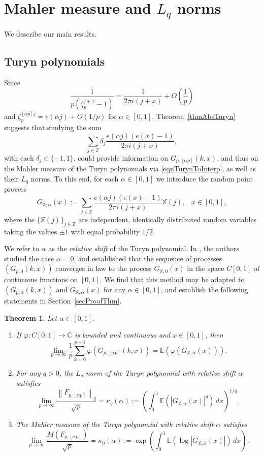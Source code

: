 \documentclass[reqno]{amsart}
\newtheorem{theorem}{Theorem}[section]
\numberwithin{equation}{section}
\numberwithin{table}{section}
\numberwithin{figure}{section}
\newcommand{\abs}[1]{\left\lvert#1\right\rvert}
\newcommand{\dbars}[1]{\left\lVert#1\right\rVert}
\newcommand{\round}[1]{\left\lfloor#1\right\rceil}
\begin{document}
\section{Mahler measure and $L_q$ norms}\label{secRandProc}

We describe our main results.

\subsection{Turyn polynomials}\label{subsecTuryn}
Since
\[
\frac{1}{p(\zeta_p^{j+x}-1)} = \frac{1}{2\pi i(j+x)} + O\left(\frac{1}{p}\right)
\]
and
$\zeta_p^{\round{\alpha p}j} = e(\alpha j) + O(1/p)$
for $\alpha\in[0,1]$, Theorem~\ref{thmAbsTuryn} suggests that studying the sum
\[
\sum_{j\in\mathbb{Z}} \delta_j \frac{e(\alpha j)(e(x)-1)}{2\pi i (j+x)},
\]
with each $\delta_j\in\{-1,1\}$, could provide information on $G_{p,\round{\alpha p}}(k,x)$, and thus on the Mahler measure of the Turyn polynomials via \eqref{eqnTurynToInterp}, as well as their $L_q$ norms.
To this end, for each $\alpha\in[0,1]$ we introduce the random point process
\begin{equation}\label{eqnRandProc}
G_{\mathbb{X},\alpha}(x) := \sum_{j\in\mathbb{Z}} \frac{e(\alpha j)(e(x)-1)}{2\pi i (j+x)} \mathbb{X}(j), \;\;\; x\in[0,1],
\end{equation}
where the $\{\mathbb{X}(j)\}_{j\in\mathbb{Z}}$ are independent, identically distributed random variables taking the values $\pm1$ with equal probability $1/2$.

We refer to $\alpha$ as the \textit{relative shift} of the Turyn polynomial.
In \cite{KLM23}, the authors studied the case $\alpha=0$, and established that the sequence of processes $(G_{p,0}(k,x))$ converges in law to the process $G_{\mathbb{X},0}(x)$ in the space $C[0,1]$ of continuous functions on $[0,1]$.
We find that this method may be adapted to $(G_{p,\alpha}(k,x))$ and $G_{\mathbb{X},\alpha}(x)$ for any $\alpha\in[0,1]$, and establish the following statements in Section~\ref{secProofThm}.

\begin{theorem}\label{thmTuryn}
Let $\alpha\in[0,1]$.
\begin{enumerate}[label=(\roman*)]
\item\label{partPhi}
If $\varphi : C[0,1] \to \mathbb{C}$ is bounded and continuous and $x\in[0,1]$, then
\[
\lim_{p\to\infty} \frac{1}{p} \sum_{k=0}^{p-1} \varphi\left(G_{p,\round{\alpha p}}(k, x)\right) = \mathbb{E}(\varphi(G_{\mathbb{X},\alpha}(x))).
\]
\item\label{partLq}
For any $q>0$, the $L_q$ norm of the Turyn polynomial with relative shift $\alpha$ satisfies
\[
\lim_{p\to\infty} \frac{\dbars{F_{p,\round{\alpha p}}}_q}{\sqrt{p}}
= \kappa_q(\alpha)
:= \left(\int_0^1 \mathbb{E}(\abs{G_{\mathbb{X},\alpha}(x)}^q)\, dx\right)^{1/q}.
\]
\item\label{partMeasure}
The Mahler measure of the Turyn polynomial with relative shift $\alpha$ satisfies
\[
\lim_{p\to\infty} \frac{M(F_{p,\round{\alpha p}})}{\sqrt{p}}
= \kappa_0(\alpha)
:= \exp\left(\int_0^1 \mathbb{E}(\log \abs{G_{\mathbb{X},\alpha}(x)})\, dx\right).
\]
\end{enumerate}
\end{theorem}
\end{document}
